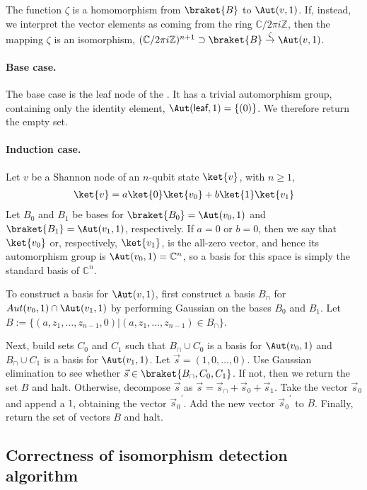 The function $\zeta$ is a homomorphism from $\braket{B}$ to $\Aut(v,1)$.
If, instead, we interpret the vector elements as coming from the ring $\mathbb C/2\pi i\mathbb Z$, then the mapping $\zeta$ is an isomorphism, $ (\mathbb C/2\pi i\mathbb Z)^{n+1}\supset \braket{B}\overset{\zeta}{\to} \Aut(v,1)$.

\paragraph{Base case.} The base case is the \textsf{leaf} node of the \textsf{\limdd}.
It has a trivial automorphism group, containing only the identity element, $\Aut(\textsf{leaf},1)=\{(0)\}$.
We therefore return the empty set.

\paragraph{Induction case.} Let $v$ be a Shannon node of an $n$-qubit state $\ket{v}$, with $n\geq 1$,
\begin{align}
\ket{v} = a\ket{0}\ket{v_0} + b\ket{1}\ket{v_1}
\end{align}
Let $B_0$ and $B_1$ be bases for $\braket{B_0}=\Aut(v_0,1)$ and $\braket{B_1}=\Aut(v_1,1)$, respectively.
If $a=0$ or $b=0$, then we say that $\ket{v_0}$ or, respectively, $\ket{v_1}$, is the all-zero vector, and hence its automorphism group is $\Aut(v_0,1)=\mathbb C^{n}$,
so a basis for this space is simply the standard basis of $\mathbb C^n$.

To construct a basis for $\Aut(v,1)$, first construct a basis $B_\cap$ for $Aut(v_0,1)\cap \Aut(v_1,1)$ by performing Gaussian on the bases $B_0$ and $B_1$.
Let $B:=\{(a,z_1,\ldots, z_{n-1},0)|(a,z_1,\ldots, z_{n-1})\in B_\cap\}$.

Next, build sets $C_0$ and $C_1$ such that $B_\cap\cup C_0$ is a basis for $\Aut(v_0,1)$ and $B_\cap\cup C_1$ is a basis for $\Aut(v_1,1)$.
Let $\vec{s}=(1,0,\ldots, 0)$.
Use Gaussian elimination to see whether $\vec s\in \braket{B_\cap, C_0,C_1}$.
If not, then we return the set $B$ and halt.
Otherwise, decompose $\vec s$ as $\vec s = \vec s_\cap + \vec s_0+ \vec s_1$.
Take the vector $\vec s_0$ and append a $1$, obtaining the vector ${\vec s_0}^\prime$.
Add the new vector ${\vec s_0}^\prime$ to $B$.
Finally, return the set of vectors $B$ and halt.


\subsection{Correctness of isomorphism detection algorithm}

